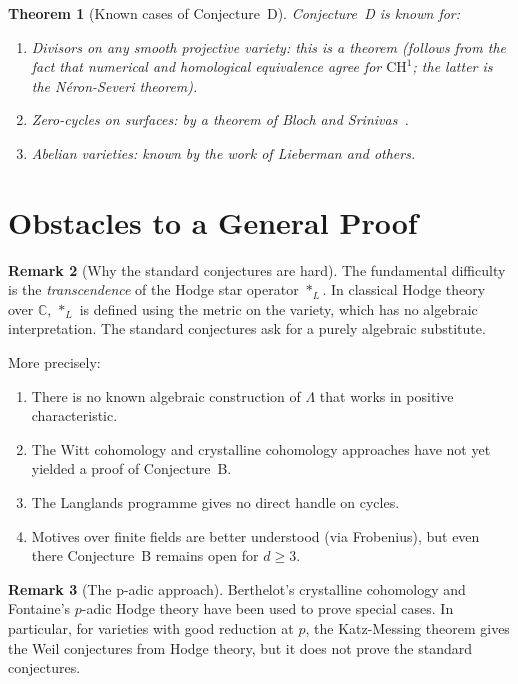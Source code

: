 \documentclass[12pt,a4paper]{amsart}
\newtheorem{theorem}{Theorem}[section]
\theoremstyle{definition}
\newtheorem{remark}[theorem]{Remark}
\newcommand{\C}{\mathbb{C}}
\newcommand{\CH}{\mathrm{CH}}
\begin{document}
\begin{theorem}[Known cases of Conjecture~D]
Conjecture~D is known for:
\begin{enumerate}[label=(\roman*)]
  \item Divisors on any smooth projective variety: this is a theorem
        (follows from the fact that numerical and homological equivalence agree
        for $\CH^1$; the latter is the N\'eron-Severi theorem).
  \item Zero-cycles on surfaces: by a theorem of Bloch and Srinivas~\cite{bloch1983}.
  \item Abelian varieties: known by the work of Lieberman and others.
\end{enumerate}
\end{theorem}

\section{Obstacles to a General Proof}\label{sec:obstacles}

\begin{remark}[Why the standard conjectures are hard]
The fundamental difficulty is the \emph{transcendence} of the Hodge star
operator $*_L$.  In classical Hodge theory over $\C$, $*_L$ is defined using
the metric on the variety, which has no algebraic interpretation.  The
standard conjectures ask for a purely algebraic substitute.

More precisely:
\begin{enumerate}[label=(\roman*)]
  \item There is no known algebraic construction of $\Lambda$ that works in
        positive characteristic.
  \item The Witt cohomology and crystalline cohomology approaches have not
        yet yielded a proof of Conjecture~B.
  \item The Langlands programme gives no direct handle on cycles.
  \item Motives over finite fields are better understood (via Frobenius), but
        even there Conjecture~B remains open for $d \geq 3$.
\end{enumerate}
\end{remark}

\begin{remark}[The p-adic approach]
Berthelot's crystalline cohomology and Fontaine's $p$-adic Hodge theory have
been used to prove special cases.  In particular, for varieties with good
reduction at $p$, the Katz-Messing theorem gives the Weil conjectures from
Hodge theory, but it does not prove the standard conjectures.
\end{remark}
\end{document}
